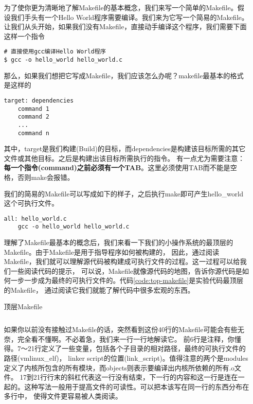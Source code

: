为了使你更为清晰地了解Makefile的基本概念，我们来写一个简单的Makefile。假设我们手头有一个Hello World程序需要编译。我们来为它写一个简易的Makefile。
让我们从头开始，如果我们没有Makefile，直接动手编译这个程序，我们需要下面这样一个指令

\begin{verbatim}
# 直接使用gcc编译Hello World程序
$ gcc -o hello_world hello_world.c
\end{verbatim}

那么，如果我们想把它写成Makefile，我们应该怎么办呢？makefile最基本的格式是这样的

\begin{verbatim}
target: dependencies
    command 1
    command 2
    ...
    command n
\end{verbatim}

其中，target是我们构建(Build)的目标，而dependencies是构建该目标所需的其它文件或其他目标。之后是构建出该目标所需执行的指令。
有一点尤为需要注意：\textbf{每一个指令(command)之前必须有一个TAB}。这里必须使用TAB而不能是空格，否则make会报错。

我们的简易的Makefile可以写成如下的样子，之后执行make即可产生hello\_world这个可执行文件。

\begin{verbatim}
all: hello_world.c
    gcc -o hello_world hello_world.c
\end{verbatim}

理解了Makefile最基本的概念后，我们来看一下我们的小操作系统的最顶层的Makefile。由于Makefile是用于指导程序如何被构建的，
因此，通过阅读Makefile，我们就可以理解源代码被构建成可执行文件的过程。这一过程可以给我们一些阅读代码的提示，
可以说，Makefile就像源代码的地图，告诉你源代码是如何一步一步成为最终的可执行文件的。代码\ref{code:top-makefile}是实验代码最顶层的Makefile，
通过阅读它我们就能了解代码中很多宏观的东西。

\begin{codeBoxWithCaption}{顶层Makefile\label{code:top-makefile}}
  \inputminted[linenos]{make}{codes/top-Makefile}
\end{codeBoxWithCaption}

如果你以前没有接触过Makefile的话，突然看到这份40行的Makefile可能会有些无奈，完全看不懂啊。不必着急，我们来一行一行地解读它。
前6行是注释，你懂得。7～21行定义了一些变量，包括各个子目录的相对路径，最终的可执行文件的路径(vmlinux\_elf)，
linker script的位置(link\_script)。值得注意的两个是modules定义了内核所包含的所有模块，而objects则表示要编译出内核所依赖的所有.o文件。
17到21行行末的斜杠代表这一行没有结束，下一行的内容和这一行是连在一起的。这种写法一般用于提高文件的可读性。可以把本该写在同一行的东西分布在多行中，
使得文件更容易被人类阅读。

